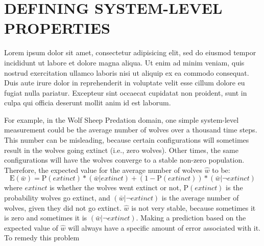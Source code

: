 \chapter{DEFINING SYSTEM-LEVEL PROPERTIES}
\thispagestyle{plain}

\label{Defining}

Lorem ipsum dolor sit amet, consectetur adipisicing elit, sed do eiusmod tempor incididunt ut labore et dolore magna aliqua. Ut enim ad minim veniam, quis nostrud exercitation ullamco laboris nisi ut aliquip ex ea commodo consequat. Duis aute irure dolor in reprehenderit in voluptate velit esse cillum dolore eu fugiat nulla pariatur. Excepteur sint occaecat cupidatat non proident, sunt in culpa qui officia deserunt mollit anim id est laborum.


For example, in the Wolf Sheep Predation domain, one simple system-level measurement could be the average number of wolves over a thousand time steps.
This number can be misleading, because certain configurations will sometimes result in the wolves going extinct (i.e., zero wolves).
Other times, the same configurations will have the wolves converge to a stable non-zero population.
Therefore, the expected value for the average number of wolves $\hat w$ to be:
\[\mathrm{E}(\bar w) = \mathrm{P}(extinct) * (\bar w | extinct) + (1 - \mathrm{P}(extinct)) * (\bar w | \neg extinct) \]
where $extinct$ is whether the wolves went extinct or not, $\mathrm{P}(extinct)$ is the probability wolves go extinct, and $(\bar w | \neg extinct)$ is the average number of wolves, given they did not go extinct.
$\hat w$ is not very stable, because sometimes it is zero and sometimes it is $(\bar w | \neg extinct)$.
Making a prediction based on the expected value of $\hat w$ will always have a specific amount of error associated with it.
To remedy this problem

